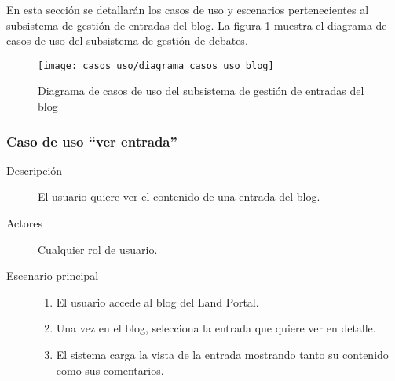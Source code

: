 En esta sección se detallarán los casos de uso y escenarios pertenecientes al subsistema de gestión de entradas del blog. La figura \ref{fig:casos_uso_subsistema_blog} muestra el diagrama de casos de uso del subsistema de gestión de debates.

\begin{figure}[h]
\centering
\texttt{[image: casos\_uso/diagrama\_casos\_uso\_blog]}
\caption{Diagrama de casos de uso del subsistema de gestión de entradas del blog}
\label{fig:casos_uso_subsistema_blog}
\end{figure}


\subsubsection{Caso de uso ``ver entrada''}
\begin{description}
\item[Descripción] 				El usuario quiere ver el contenido de una entrada del blog.
\item[Actores]					Cualquier rol de usuario.
\item[Escenario principal]	 	\hfill
								\begin{enumerate}
								\item El usuario accede al blog del Land Portal.
								\item Una vez en el blog, selecciona la entrada que quiere ver en detalle.
								\item El sistema carga la vista de la entrada mostrando tanto su contenido como sus comentarios.
								\end{enumerate}
\end{description}


